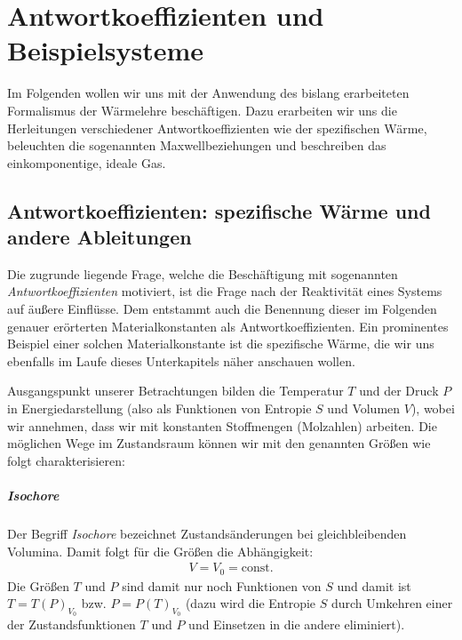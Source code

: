 \chapter{Antwortkoeffizienten und Beispielsysteme}
Im Folgenden wollen wir uns mit der Anwendung des bislang erarbeiteten Formalismus der Wärmelehre beschäftigen. Dazu erarbeiten wir uns die Herleitungen verschiedener Antwortkoeffizienten wie der spezifischen Wärme, beleuchten die sogenannten Maxwellbeziehungen und beschreiben das einkomponentige, ideale Gas.
\section{Antwortkoeffizienten: spezifische Wärme und andere Ableitungen}
Die zugrunde liegende Frage, welche die Beschäftigung mit sogenannten \emph{Antwortkoeffizienten} motiviert, ist die Frage nach der Reaktivität eines Systems auf äußere Einflüsse. Dem entstammt auch die Benennung dieser \textendash{} im Folgenden genauer erörterten \textendash{} Materialkonstanten als Antwortkoeffizienten.
Ein prominentes Beispiel einer solchen Materialkonstante ist die spezifische Wärme, die wir uns ebenfalls im Laufe dieses Unterkapitels näher anschauen wollen.


Ausgangspunkt unserer Betrachtungen bilden die Temperatur $T$ und der Druck $P$ in Energiedarstellung (also als Funktionen von Entropie $S$ und Volumen $V$), wobei wir annehmen, dass wir mit konstanten Stoffmengen (Molzahlen) arbeiten.  Die möglichen Wege im Zustandsraum können wir mit den genannten Größen wie folgt charakterisieren:


\paragraph*{Isochore}
Der Begriff \emph{Isochore} bezeichnet Zustandsänderungen bei gleichbleibenden Volumina. Damit folgt für die Größen die Abhängigkeit:
\begin{align*}
    V=V_0=\mathrm{const}.
\end{align*}
Die Größen $T$ und $P$ sind damit nur noch Funktionen von $S$ und damit ist $T=T(P)_{V_0}$ bzw. $P=P(T)_{V_0}$ (dazu wird die Entropie $S$ durch Umkehren einer der Zustandsfunktionen $T$ und $P$ und Einsetzen in die andere eliminiert).


